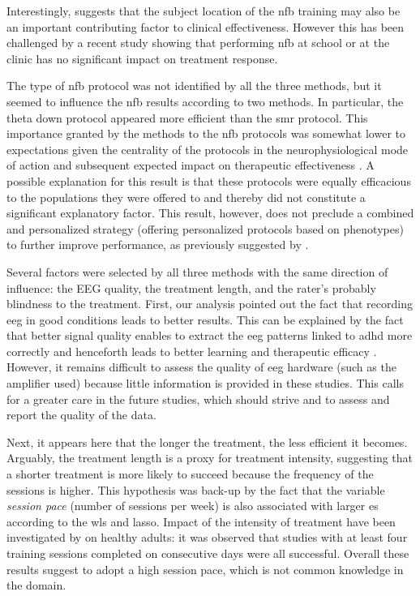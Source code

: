 Interestingly, \citep{Minder2018} suggests that the subject location of the \gls{nfb} training may also be an important contributing 
factor to clinical effectiveness. However this has been challenged by a recent study \citep{Minder2018} showing that 
performing \gls{nfb} at school or at the clinic has no significant impact on treatment response. 

The type of \gls{nfb} protocol was not identified by all the three methods, but it seemed to influence the \gls{nfb} results
according to two methods. In particular, the theta down protocol appeared more efficient than the \gls{smr} protocol. 
This importance granted by the methods to the \gls{nfb} protocols was somewhat lower to
expectations given the centrality of the protocols in the neurophysiological mode of action and subsequent expected impact on
therapeutic effectiveness \citep{Vernon2004}. A possible explanation for this result is that these protocols were equally 
efficacious to the populations they were offered to and thereby did not constitute a significant explanatory factor. 
This result, however, does not preclude a combined and personalized strategy (offering personalized protocols based on phenotypes)
to further improve performance, as previously suggested by \citet{Alkoby2017}.

Several factors were selected by all three methods with the same direction of influence: the EEG quality, the treatment 
length, and the rater's probably blindness to the treatment. First, our analysis pointed out the fact that recording \gls{eeg} 
in good conditions leads to better results.
This can be explained by the fact that better signal quality enables to extract the \gls{eeg} patterns
linked to \gls{adhd} more correctly and henceforth leads to better learning and therapeutic efficacy \citep{Congedo2004}. 
However, it remains difficult to assess the quality of \gls{eeg} hardware (such as the amplifier used) 
because little information is provided in these studies.  
This calls for a greater care in the future studies, which should strive and to assess and report the quality of the data.

Next, it appears here that the longer the treatment, the less efficient it becomes. Arguably, the treatment length is a
proxy for treatment intensity, suggesting that a shorter treatment is more likely to succeed because the frequency of the sessions
is higher. This hypothesis was back-up by the fact that the variable \emph{session pace} (number of
sessions per week) is also associated with larger \gls{es} according to the \gls{wls} and \gls{lasso}. Impact of the
intensity of treatment have been investigated by \citep{Rogala2016} on healthy adults: it was observed that studies with
at least four training sessions completed on consecutive days were all successful. Overall these results suggest to adopt a high session pace, 
which is not common knowledge in the domain.

